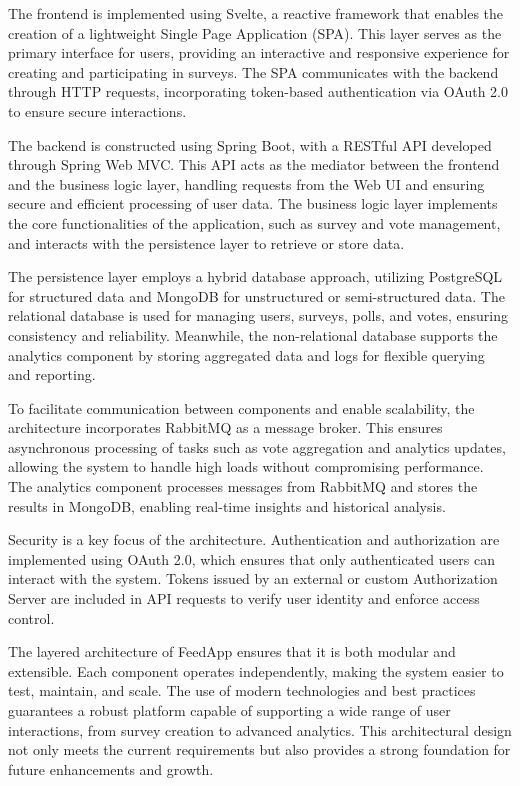 \noindent
The frontend is implemented using Svelte, a reactive framework that enables the creation of a lightweight Single Page Application (SPA). This layer serves as the primary interface for users, providing an interactive and responsive experience for creating and participating in surveys. The SPA communicates with the backend through HTTP requests, incorporating token-based authentication via OAuth 2.0 to ensure secure interactions.
\medskip

\noindent
The backend is constructed using Spring Boot, with a RESTful API developed through Spring Web MVC. This API acts as the mediator between the frontend and the business logic layer, handling requests from the Web UI and ensuring secure and efficient processing of user data. The business logic layer implements the core functionalities of the application, such as survey and vote management, and interacts with the persistence layer to retrieve or store data.
\medskip

\noindent
The persistence layer employs a hybrid database approach, utilizing PostgreSQL for structured data and MongoDB for unstructured or semi-structured data. The relational database is used for managing users, surveys, polls, and votes, ensuring consistency and reliability. Meanwhile, the non-relational database supports the analytics component by storing aggregated data and logs for flexible querying and reporting.
\medskip

\noindent
To facilitate communication between components and enable scalability, the architecture incorporates RabbitMQ as a message broker. This ensures asynchronous processing of tasks such as vote aggregation and analytics updates, allowing the system to handle high loads without compromising performance. The analytics component processes messages from RabbitMQ and stores the results in MongoDB, enabling real-time insights and historical analysis.
\medskip

\noindent
Security is a key focus of the architecture. Authentication and authorization are implemented using OAuth 2.0, which ensures that only authenticated users can interact with the system. Tokens issued by an external or custom Authorization Server are included in API requests to verify user identity and enforce access control.
\medskip

\noindent
The layered architecture of FeedApp ensures that it is both modular and extensible. Each component operates independently, making the system easier to test, maintain, and scale. The use of modern technologies and best practices guarantees a robust platform capable of supporting a wide range of user interactions, from survey creation to advanced analytics. This architectural design not only meets the current requirements but also provides a strong foundation for future enhancements and growth.






